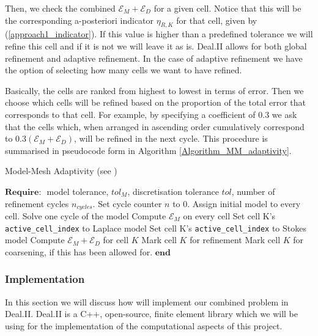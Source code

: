 \documentclass[12pt,a4paper]{article}
\theoremstyle{definition}
\begin{document}
Then, we check the combined $\mathcal{E}_M+\mathcal{E}_D$ for a given cell.  Notice that this will be the corresponding a-posteriori indicator $\eta_{R,K}$ for that cell, given by (\ref{approach1_indicator}).  If this value is higher than a predefined tolerance we will refine this cell and if it is not we will leave it as is.  Deal.II allows for both global refinement and adaptive refinement.  In the case of adaptive refinement we have the option of selecting how many cells we want to have refined.  

Basically, the cells are ranked  from highest to lowest in terms of error.  Then we choose which cells will be refined based on the proportion of the total error that corresponds to that cell.  For example, by specifying a coefficient of 0.3 we ask that the cells which, when arranged in ascending order cumulatively correspond to $0.3\left(\mathcal{E}_M+\mathcal{E}_D\right)$, will be refined in the next cycle.  This procedure is summarised in pseudocode form in Algorithm \ref{Algorithm_MM_adaptivity}.
 \begin{algorithm}[t]
 	\caption{Model-Mesh Adaptivity (see \cite[\S6: Algorithm 6.1]{giesselmann2017posteriori})}\label{Algorithm_MM_adaptivity}
 	\begin{algorithmic}
 		\State $\textbf{Require: }$ model tolerance, $tol_{M}$, discretisation tolerance $tol$, number of refinement cycles $n_{cycles}$.
 		\State Set cycle counter $n$ to $0$.
 		\State Assign initial  model to every cell.
 		\State Solve one cycle of the model
 		\State Compute $\mathcal{E}_M$ on every cell
 		\State Set cell K's \texttt{active\_cell\_index} to Laplace model
 		\Else
 		\State Set cell K's \texttt{active\_cell\_index} to Stokes model
 		\EndIf
 		\State Compute $\mathcal{E}_M+\mathcal{E}_D$ for cell $K$
 		\State Mark cell $K$ for refinement
 		\Else
 		\State Mark cell $K$ for coarsening, if this has been allowed for.
 		\EndIf
 		\EndFor
 		\EndWhile
 		\State $\textbf{end}$
 	\end{algorithmic}
 \end{algorithm}
 \subsubsection{Implementation}\label{sec_combi_implementation}
In this section we will discuss how will implement our combined problem in Deal.II.   Deal.II is a C++, open-source, finite element library which we will be using for the implementation of the computational aspects of this project.   
\end{document}
